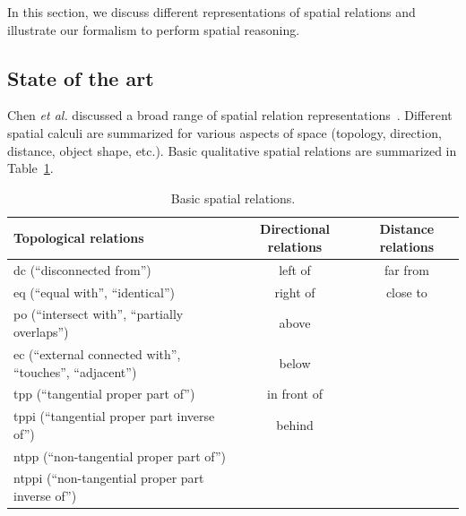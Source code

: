 \documentclass{article}
\begin{document}
 In this section, we discuss different representations of spatial relations and illustrate our formalism to perform spatial reasoning.

\subsection{State of the art}
Chen \textit{et al.} discussed a broad range of spatial relation representations~\cite{chen2013survey}. Different spatial calculi are summarized for various aspects of space 
(topology, direction, distance, object shape, etc.). Basic qualitative spatial relations are summarized in Table~\ref{tab:sr}.
\begin{center}
\begin{table}[h]
   \begin{tabular}{| l | c | c |}
    \hline
    Topological relations~\cite{randell1992spatial} & Directional relations & Distance relations \\ \hline
    dc (``disconnected from'') & left of & far from \\ 
    eq (``equal with'', ``identical'') & right of & close to \\
    po (``intersect with'', ``partially overlaps'') & above  &   \\
    ec (``external connected with'', ``touches'', ``adjacent'') & below &  \\
    tpp (``tangential proper part of'') & in front of &  \\
    tppi (``tangential proper part inverse of'') &  behind  &   \\
    ntpp (``non-tangential proper part of'') &   &  \\
    ntppi (``non-tangential proper part inverse of'') &  &  \\
    \hline
  \end{tabular}
  \caption{Basic spatial relations.}
  \label{tab:sr}  
\end{table}
\end{center}
\end{document}
